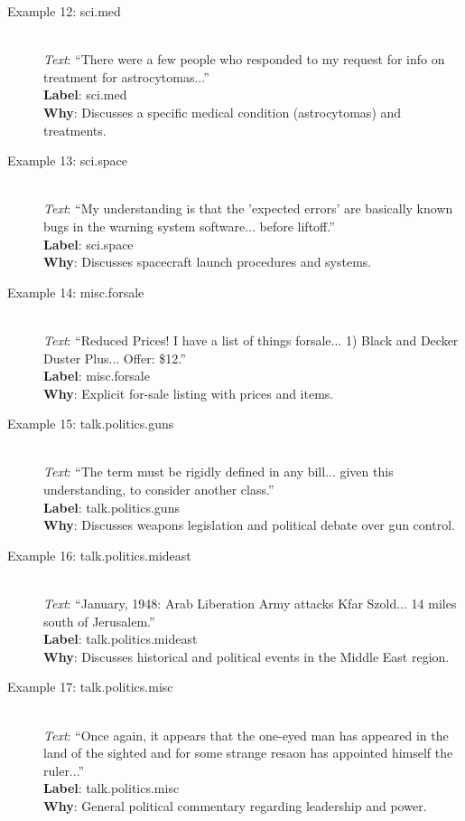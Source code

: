 \documentclass{article}
\begin{document}
\begin{description}
    \item[Example 12: sci.med] \hfill \\
    \textit{Text}: ``There were a few people who responded to my request for info on treatment for astrocytomas...'' \\
    \textbf{Label}: sci.med \\
    \textbf{Why}: Discusses a specific medical condition (astrocytomas) and treatments.

    \item[Example 13: sci.space] \hfill \\
    \textit{Text}: ``My understanding is that the 'expected errors' are basically known bugs in the warning system software... before liftoff.'' \\
    \textbf{Label}: sci.space \\
    \textbf{Why}: Discusses spacecraft launch procedures and systems.

    \item[Example 14: misc.forsale] \hfill \\
    \textit{Text}: ``Reduced Prices! I have a list of things forsale... 1) Black and Decker Duster Plus... Offer: \$12.'' \\
    \textbf{Label}: misc.forsale \\
    \textbf{Why}: Explicit for-sale listing with prices and items.

    \item[Example 15: talk.politics.guns] \hfill \\
    \textit{Text}: ``The term must be rigidly defined in any bill... given this understanding, to consider another class.'' \\
    \textbf{Label}: talk.politics.guns \\
    \textbf{Why}: Discusses weapons legislation and political debate over gun control.

    \item[Example 16: talk.politics.mideast] \hfill \\
    \textit{Text}: ``January, 1948: Arab Liberation Army attacks Kfar Szold... 14 miles south of Jerusalem.'' \\
    \textbf{Label}: talk.politics.mideast \\
    \textbf{Why}: Discusses historical and political events in the Middle East region.

    \item[Example 17: talk.politics.misc] \hfill \\
    \textit{Text}: ``Once again, it appears that the one-eyed man has appeared in the land of the sighted and for some strange resaon has appointed himself the ruler...'' \\
    \textbf{Label}: talk.politics.misc \\
    \textbf{Why}: General political commentary regarding leadership and power.


\end{description}
\end{document}
